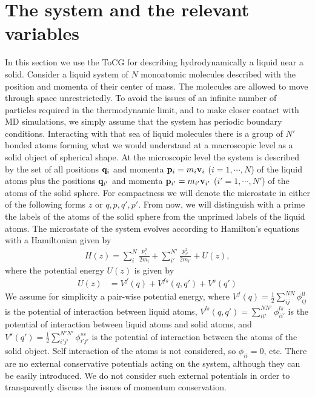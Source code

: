 \documentclass[b5paper,openright,10pt]{book}
\begin{document}
\section{The system and the relevant variables}
In this section we use the ToCG for describing hydrodynamically a liquid near a solid. 
Consider a liquid system of $N$ monoatomic molecules described
with the position and momenta of  their center of mass.  The molecules
are allowed to move through  space unrestrictedly. To avoid the issues
of  an infinite  number  of particles  required  in the  thermodynamic
limit, and to make closer contact with MD simulations,
we simply  assume that  the system  has periodic  boundary conditions.
Interacting with that sea of liquid molecules there is a group of $N'$
bonded atoms forming  what we would understand at a macroscopic level
as a solid object of spherical shape. 
At the microscopic level the system is described  by the set of all  positions  ${\bf  q}_i$  and  momenta  ${\bf  p}_i=m_i{\bf  v}_i$
($i=1,\cdots,N$) of the liquid atoms plus the positions ${\bf q}_{i'}$
and  momenta ${\bf  p}_{i'}=m_{i'}{\bf v}_{i'}$  ($i'=1,\cdots,N'$) of
the atoms  of the solid  sphere.  For  compactness we will  denote the
microstate in either  of the following forms $z$  or ${q,p,q',p'}$. From now, we
will distinguish  with a prime  the labels of  the atoms of  the solid
sphere from the  unprimed labels of the liquid  atoms.  The microstate
of  the  system  evolves  according to  Hamilton's  equations  with  a
Hamiltonian given by
\begin{eqnarray}
H(z) = \sum^N_i \frac{p_i^2}{2m_i} + \sum^{N'}_{i'} \frac{p_{i'}^2}{2m_{i'}}
+ U(z),
\label{H}
\end{eqnarray}
where the potential energy $U(z)$ is given by
\begin{align}
U(z)&=  V^{f}(q)+ V^{fs}(q,q')+ V^{s}(q')
\end{align}
We  assume   for  simplicity  a  pair-wise   potential  energy,  where
$V^{f}(q)=\frac{1}{2}\sum^{{NN}}_{i   j}\phi^{ll}_{ij}$   is   the
potential  of  interaction  between   liquid  atoms,  $  V^{ls}(q,q')=
\sum^{NN'}_{ii'}\phi^{ls}_{ii'}$  is  the   potential  of  interaction
between   liquid   atoms   and   solid   atoms,   and   $   V^{s}(q')=
\frac{1}{2}\sum^{{N'N'}}_{i' j'}\phi^{ss}_{i'j'}$ is the potential
of  interaction  between   the  atoms  of  the   solid  object.   Self
interaction of  the atoms  is not  considered, so  $\phi_{ii}=0$, etc.
There are  no external conservative  potentials acting on  the system,
although  they can  be  easily  introduced. We  do  not consider  such
external potentials  in order to  transparently discuss the  issues of
momentum conservation.
\end{document}
